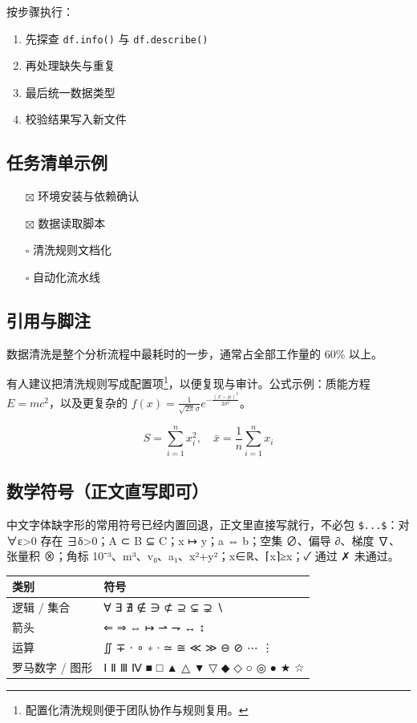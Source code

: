 \documentclass[zihao=-4]{ctexart}
\numberwithin{equation}{section}
\numberwithin{figure}{section}
\numberwithin{table}{section}
\theoremstyle{plain}
\begin{document}
按步骤执行：

\begin{enumerate}
\item 先探查 \texttt{df.info()} 与 \texttt{df.describe()}
\item 再处理缺失与重复
\item 最后统一数据类型
\item 校验结果写入新文件
\end{enumerate}

\subsection{任务清单示例}

\begin{itemize}
\item[$\boxtimes$] 环境安装与依赖确认
\item[$\boxtimes$] 数据读取脚本
\item[$\square$] 清洗规则文档化
\item[$\square$] 自动化流水线
\end{itemize}

\subsection{引用与脚注}

\begin{mdpdfquote}
数据清洗是整个分析流程中最耗时的一步，通常占全部工作量的 60\% 以上。
\end{mdpdfquote}

有人建议把清洗规则写成配置项\footnote{配置化清洗规则便于团队协作与规则复用。}，以便复现与审计。公式示例：质能方程 $E = mc^2$，以及更复杂的 $f(x) = \frac{1}{\sqrt{2\pi}\sigma} e^{-\frac{(x-\mu)^2}{2\sigma^2}}$。

\[S = \sum_{i=1}^{n} x_i^2, \quad \bar{x} = \frac{1}{n}\sum_{i=1}^{n} x_i\]

\subsection{数学符号（正文直写即可）}

中文字体缺字形的常用符号已经内置回退，正文里直接写就行，不必包 \texttt{\$...\$}：对 ∀ε>0 存在 ∃δ>0；A ⊂ B ⊆ C；x ↦ y；a ⇔ b；空集 ∅、偏导 ∂、梯度 ∇、张量积 ⊗；角标 10⁻³、m³、v₀、a₁、x²+y²；x∈ℝ、⌈x⌉≥x；✓ 通过 ✗ 未通过。

\noindent \begin{tabularx}{\linewidth}{lL}
\toprule
类别 & 符号 \\
\midrule
逻辑 / 集合 & ∀ ∃ ∄ ∉ ∋ ⊄ ⊇ ⊊ ⊋ ∖ \\
箭头 & ⇐ ⇒ ⇔ ↦ ⇀ ⇁ ↔ ↕ \\
运算 & ∬ ∓ ⋅ ∘ ∗ ∙ ≃ ≅ ≪ ≫ ⊖ ⊘ ⋯ ⋮ \\
罗马数字 / 图形 & Ⅰ Ⅱ Ⅲ Ⅳ ■ □ ▲ △ ▼ ▽ ◆ ◇ ○ ◎ ● ★ ☆ \\
\bottomrule
\end{tabularx}
\end{document}
